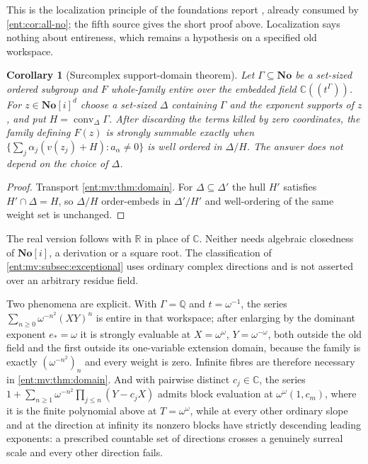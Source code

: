 \documentclass[11pt]{article}
\theoremstyle{plain}
\theoremstyle{plain}
\theoremstyle{plain}
\newtheorem{corollary}[corollary]{Corollary}
\theoremstyle{definition}
\theoremstyle{definition}
\theoremstyle{definition}
\theoremstyle{definition}
\theoremstyle{remark}
\newcommand{\C}{\mathbb C}\newcommand{\R}{\mathbb R}
\newcommand{\Q}{\mathbb Q}\newcommand{\Z}{\mathbb Z}\newcommand{\N}{\mathbb N}
\newcommand{\No}{\mathbf{No}}
\DeclareMathOperator{\conv}{conv}
\begin{document}
This is the localization principle of the foundations report \cite{RepoFoundations},
already consumed by \cref{ent:cor:all-no}; the fifth source gives the short
proof above. Localization says nothing about entireness, which remains a
hypothesis on a specified old workspace.

\begin{corollary}[Surcomplex support-domain theorem]\label{ent:mv:cor:surcomplex}
Let $\Gamma\subseteq\No$ be a set-sized ordered subgroup and $F$ whole-family
entire over the embedded field $\C((t^\Gamma))$. For $z\in\No[i]^d$ choose a
set-sized $\Delta$ containing $\Gamma$ and the exponent supports of $z$, and
put $H=\conv_\Delta\Gamma$. After discarding the terms killed by zero
coordinates, the family defining $F(z)$ is strongly summable exactly when
$\{\sum_j\alpha_j(v(z_j)+H):a_\alpha\ne0\}$ is well ordered in $\Delta/H$.
The answer does not depend on the choice of $\Delta$.
\end{corollary}
\begin{proof}
Transport \cref{ent:mv:thm:domain}. For $\Delta\subseteq\Delta'$ the hull
$H'$ satisfies $H'\cap\Delta=H$, so $\Delta/H$ order-embeds in $\Delta'/H'$
and well-ordering of the same weight set is unchanged.
\end{proof}

The real version follows with $\R$ in place of $\C$. Neither needs algebraic
closedness of $\No[i]$, a derivation or a square root. The classification
of \cref{ent:mv:subsec:exceptional} uses ordinary complex directions and is
not asserted over an arbitrary residue field.

Two phenomena are explicit. With $\Gamma=\Q$ and $t=\omega^{-1}$, the series
$\sum_{n\ge0}\omega^{-n^2}(XY)^n$ is entire in that workspace; after
enlarging by the dominant exponent $e_*=\omega$ it is strongly evaluable at
$X=\omega^{\omega}$, $Y=\omega^{-\omega}$, both outside the old field and the
first outside its one-variable extension domain, because the family is
exactly $(\omega^{-n^2})_n$ and every weight is zero. Infinite fibres are
therefore necessary in \cref{ent:mv:thm:domain}. And with pairwise distinct
$c_j\in\C$, the series
$1+\sum_{n\ge1}\omega^{-n^2}\prod_{j\le n}(Y-c_jX)$ admits block evaluation
at $\omega^{\omega}(1,c_m)$, where it is the finite polynomial above at
$T=\omega^\omega$, while at every other ordinary slope and at the direction
at infinity its nonzero blocks have strictly descending leading exponents: a
prescribed countable set of directions crosses a genuinely surreal scale and
every other direction fails.
\end{document}
